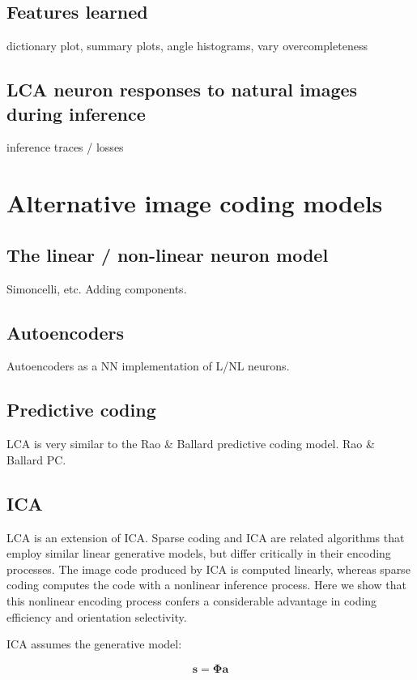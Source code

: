 \subsection{Features learned}
dictionary plot, summary plots, angle histograms, vary overcompleteness


\subsection{LCA neuron responses to natural images during inference}
inference traces / losses


\section{Alternative image coding models}


\subsection{The linear / non-linear neuron model}
Simoncelli, etc. Adding components.


\subsection{Autoencoders}
Autoencoders as a NN implementation of L/NL neurons.


\subsection{Predictive coding}
LCA is very similar to the Rao & Ballard predictive coding model.
Rao & Ballard PC.


\subsection{ICA}
LCA is an extension of ICA.
Sparse coding and ICA are related algorithms that employ similar linear generative models, but differ critically in their encoding processes. The image code produced by ICA is computed linearly, whereas sparse coding computes the code with a nonlinear inference process. Here we show that this nonlinear encoding process confers a considerable advantage in coding efficiency and orientation selectivity.

ICA assumes the generative model:

\begin{equation}
\mathbf{s} = \mathbf{\Phi a}
\end{equation}

